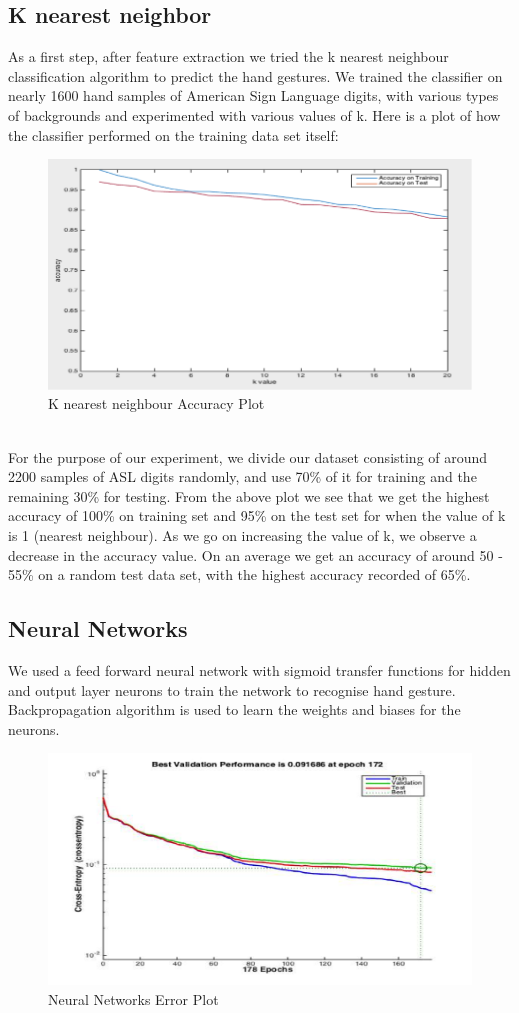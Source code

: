 \documentclass{acm} %
\begin{document}
\subsection{K nearest neighbor}
As a first step, after feature extraction we tried the k nearest neighbour classification algorithm to predict the hand gestures. We trained the classifier on nearly 1600 hand samples of American Sign Language digits, with various types of backgrounds and experimented with various values of k. Here is a plot of how the classifier performed on the training data set itself:
\begin{figure}[h]
\centering
\includegraphics[width=3 in]{knn}
\caption{K nearest neighbour Accuracy Plot}
\label{fig:fig12}
\end{figure}
\\
For the purpose of our experiment, we divide our dataset consisting of around 2200 samples of ASL digits randomly, and use 70\% of it for training and the remaining 30\% for testing. From the above plot we see that we get the highest accuracy of 100\% on training set and 95\% on the test set for when the value of k is 1 (nearest neighbour). As we go on increasing the value of k, we observe a decrease in the accuracy value. On an average we get an accuracy of around 50  - 55\% on a random test data set, with the highest accuracy recorded of 65\%.
\subsection{Neural Networks}
We used a feed forward neural network with sigmoid transfer functions for hidden and output layer neurons to train the network to recognise hand gesture. Backpropagation algorithm is used to learn the weights and biases for the neurons. 

\begin{figure}[h]
\centering
\includegraphics[width=3 in]{nn_error_plot}
\caption{Neural Networks Error Plot}
\label{fig:fig13}
\end{figure}
\end{document}
